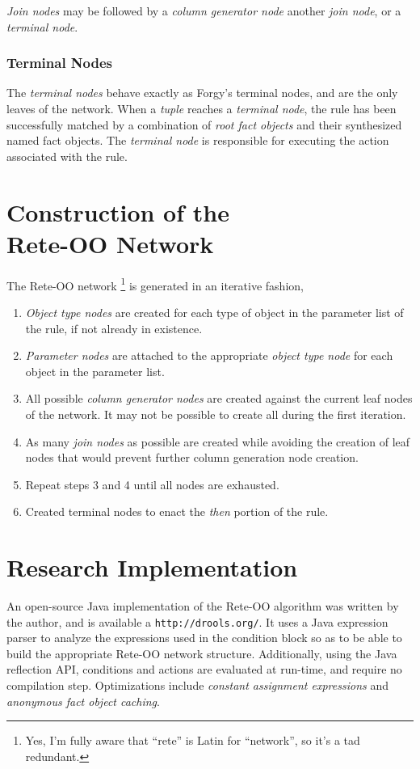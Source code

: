 \documentclass[10pt,twocolumn,letterpaper,colorhighlight]{article}
\begin{document}
\emph{Join nodes} may be followed by a \emph{column generator
node} another \emph{join node}, or a \emph{terminal node}.

\subsubsection{Terminal Nodes}

The \emph{terminal nodes} behave exactly as Forgy's terminal nodes,
and are the only leaves of the network. When a \emph{tuple} reaches
a \emph{terminal node}, the rule has been successfully matched by
a combination of \emph{root fact objects} and their synthesized
named fact objects.  The \emph{terminal node} is responsible for
executing the action associated with the rule.


\section{Construction of the\\Rete-OO Network} 

The Rete-OO network%
	\footnote{Yes, I'm fully aware that ``rete'' is 
		Latin for ``network'', so it's a tad redundant.} 
is generated in an iterative fashion, 

\begin{enumerate}
	\item \emph{Object type nodes} are created for each type of
object in the parameter list of the rule, if not already in
existence.
	\item \emph{Parameter nodes} are attached to the appropriate {\it
object type node} for each object in the parameter list.
	\item All possible \emph{column generator nodes} are created
against the current leaf nodes of the network.  It may not be possible
to create all during the first iteration.
	\item As many \emph{join nodes} as possible are created while
avoiding the creation of leaf nodes that would prevent further column
generation node creation.
	\item Repeat steps 3 and 4 until all nodes are exhausted.
	\item Created terminal nodes to enact the {\it then} portion of
the rule.
\end{enumerate}

\section{Research Implementation}

An open-source Java implementation of the Rete-OO algorithm  was written by
the author, and is available a \verb|http://drools.org/|.  It uses a
Java expression parser to analyze the expressions used in the
condition block so as to be able to build the appropriate Rete-OO
network structure. Additionally, using the Java reflection API,
conditions and actions are evaluated at run-time, and require no
compilation step.  Optimizations include \emph{constant assignment
expressions} and \emph{anonymous fact object caching}.




\end{document}
